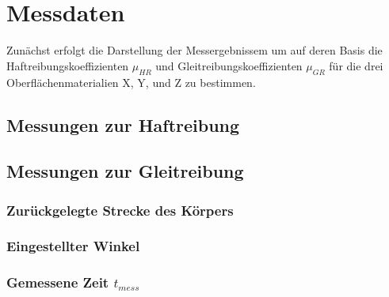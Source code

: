 \section{Messdaten}

Zunächst erfolgt die Darstellung der Messergebnissem um auf deren Basis die Haftreibungskoeffizienten $\mu_{HR}$ und Gleitreibungskoeffizienten $\mu_{GR}$ für die drei Oberflächenmaterialien X, Y, und Z zu bestimmen.

\subsection{Messungen zur Haftreibung}

\subsection{Messungen zur Gleitreibung}

\subsubsection{Zurückgelegte Strecke des Körpers}

\subsubsection{Eingestellter Winkel}

\subsubsection{Gemessene Zeit $t_{mess}$}